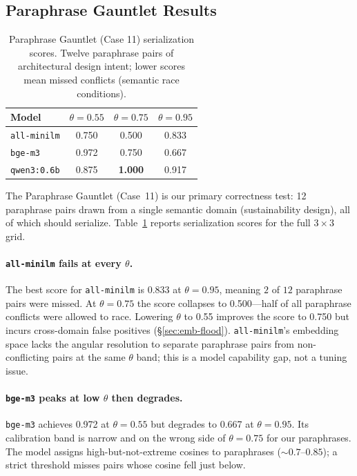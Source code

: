 \documentclass[sigconf]{acmart}
\begin{document}
\subsection{Paraphrase Gauntlet Results}
\label{sec:gauntlet}

\begin{table}[t]
  \centering
  \caption{Paraphrase Gauntlet (Case 11) serialization scores.
    Twelve paraphrase pairs of architectural design intent; lower
    scores mean missed conflicts (semantic race conditions).}
  \label{tab:gauntlet}
  \small
  \begin{tabular}{lccc}
    \toprule
    Model & $\theta=0.55$ & $\theta=0.75$ & $\theta=0.95$ \\
    \midrule
    \texttt{all-minilm}   & 0.750 & 0.500 & 0.833 \\
    \texttt{bge-m3}       & 0.972 & 0.750 & 0.667 \\
    \texttt{qwen3:0.6b}   & 0.875 & \textbf{1.000} & 0.917 \\
    \bottomrule
  \end{tabular}
\end{table}

The Paraphrase Gauntlet (Case~11) is our primary correctness test: 12
paraphrase pairs drawn from a single semantic domain (sustainability
design), all of which should serialize. Table~\ref{tab:gauntlet}
reports serialization scores for the full $3\times 3$ grid.

\paragraph{\texttt{all-minilm} fails at every $\theta$.}
The best score for \texttt{all-minilm} is 0.833 at $\theta=0.95$,
meaning $2$ of $12$ paraphrase pairs were missed. At $\theta=0.75$ the
score collapses to 0.500---half of all paraphrase conflicts were
allowed to race. Lowering $\theta$ to 0.55 improves the score to 0.750
but incurs cross-domain false positives (\S\ref{sec:emb-flood}).
\texttt{all-minilm}'s embedding space lacks the angular resolution to
separate paraphrase pairs from non-conflicting pairs at the same
$\theta$ band; this is a model capability gap, not a tuning issue.

\paragraph{\texttt{bge-m3} peaks at low $\theta$ then degrades.}
\texttt{bge-m3} achieves 0.972 at $\theta=0.55$ but degrades to 0.667
at $\theta=0.95$. Its calibration band is narrow and on the wrong side
of $\theta=0.75$ for our paraphrases. The model assigns
high-but-not-extreme cosines to paraphrases ($\sim\!0.7$--$0.85$); a
strict threshold misses pairs whose cosine fell just below.
\end{document}
